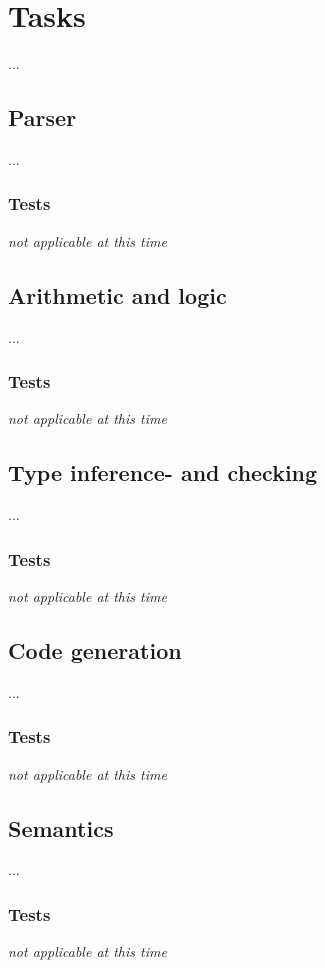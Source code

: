 \documentclass[11pt,a4paper]{article}
\begin{document}
\section{Tasks}
...

\subsection{Parser}
...

\subsubsection{Tests}
{\it not applicable at this time}

\subsection{Arithmetic and logic}
...

\subsubsection{Tests}
{\it not applicable at this time}

\subsection{Type inference- and checking}
...

\subsubsection{Tests}
{\it not applicable at this time}

\subsection{Code generation}
...

\subsubsection{Tests}
{\it not applicable at this time}

\subsection{Semantics}
...

\subsubsection{Tests}
{\it not applicable at this time}
\end{document}

